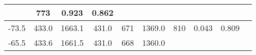 \documentclass[a4paper,10pt]{article}
\begin{document}
\begin{longtable}{
     |
%    
    c|
%    
    c|
%    
    c|
%    
    c|
%    
    c|
%    
    c|
%    
    c|
%    
    c|
%    
    c|
%    
    c|
%    
    }
%        
        & 773
%        

%        

%        
        & 0.923
%        

%        

%        
        & 0.862
%        

%        
        \\
        \hline

        

%        

%        
        -73.5
%        

%        

%        
        & 433.0
%        

%        

%        
        & 1663.1
%        

%        

%        
        & 431.0
%        

%        

%        
        & 671
%        

%        

%        
        & 1369.0
%        

%        

%        
        & 810
%        

%        

%        
        & 0.043
%        

%        

%        
        & 0.809
%        

%        
        \\
        \hline

        

%        

%        
        -65.5
%        

%        

%        
        & 433.6
%        

%        

%        
        & 1661.5
%        

%        

%        
        & 431.0
%        

%        

%        
        & 668
%        

%        

%        
        & 1360.0
%        

%        


\end{longtable}
\end{document}
